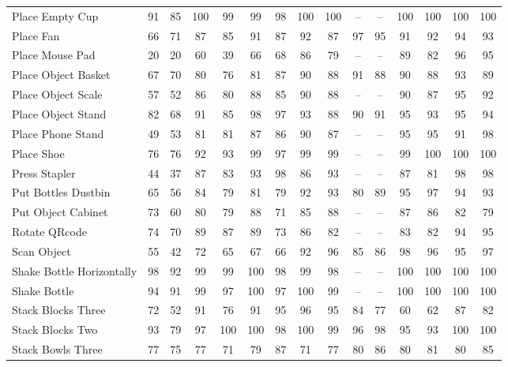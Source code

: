 \begin{table}[tp]
{\begin{tabular}{l*{14}{c}}
        Place Empty Cup             & 91 & 85 & 100 & 99 & 99 & 98 & 100 & 100 & -- & -- & 100 & 100 & 100 & 100 \\
        Place Fan                   & 66 & 71 & 87 & 85 & 91 & 87 & 92 & 87 & 97 & 95 & 91 & 92 & 94 & 93 \\
        Place Mouse Pad             & 20 & 20 & 60 & 39 & 66 & 68 & 86 & 79 & -- & -- & 89 & 82 & 96 & 95 \\
        Place Object Basket         & 67 & 70 & 80 & 76 & 81 & 87 & 90 & 88 & 91 & 88 & 90 & 88 & 93 & 89 \\
        Place Object Scale          & 57 & 52 & 86 & 80 & 88 & 85 & 90 & 88 & -- & -- & 90 & 87 & 95 & 92 \\
        Place Object Stand          & 82 & 68 & 91 & 85 & 98 & 97 & 93 & 88 & 90 & 91 & 95 & 93 & 95 & 94 \\
        Place Phone Stand           & 49 & 53 & 81 & 81 & 87 & 86 & 90 & 87 & -- & -- & 95 & 95 & 91 & 98 \\
        Place Shoe                  & 76 & 76 & 92 & 93 & 99 & 97 & 99 & 99 & -- & -- & 99 & 100 & 100 & 100 \\
        Press Stapler               & 44 & 37 & 87 & 83 & 93 & 98 & 86 & 93 & -- & -- & 87 & 81 & 98 & 98 \\
        Put Bottles Dustbin         & 65 & 56 & 84 & 79 & 81 & 79 & 92 & 93 & 80 & 89 & 95 & 97 & 94 & 93 \\
        Put Object Cabinet          & 73 & 60 & 80 & 79 & 88 & 71 & 85 & 88 & -- & -- & 87 & 86 & 82 & 79 \\
        Rotate QRcode               & 74 & 70 & 89 & 87 & 89 & 73 & 86 & 82 & -- & -- & 83 & 82 & 94 & 95 \\
        Scan Object                 & 55 & 42 & 72 & 65 & 67 & 66 & 92 & 96 & 85 & 86 & 98 & 96 & 95 & 97 \\
        Shake Bottle Horizontally   & 98 & 92 & 99 & 99 & 100 & 98 & 99 & 98 & -- & -- & 100 & 100 & 100 & 100 \\
        Shake Bottle                & 94 & 91 & 99 & 97 & 100 & 97 & 100 & 99 & -- & -- & 100 & 100 & 100 & 100 \\
        Stack Blocks Three          & 72 & 52 & 91 & 76 & 91 & 95 & 96 & 95 & 84 & 77 & 60 & 62 & 87 & 82 \\
        Stack Blocks Two            & 93 & 79 & 97 & 100 & 100 & 98 & 100 & 99 & 96 & 98 & 95 & 93 & 100 & 100 \\
        Stack Bowls Three           & 77 & 75 & 77 & 71 & 79 & 87 & 71 & 77 & 80 & 86 & 80 & 81 & 80 & 85 \\

\end{tabular}}
\end{table}
